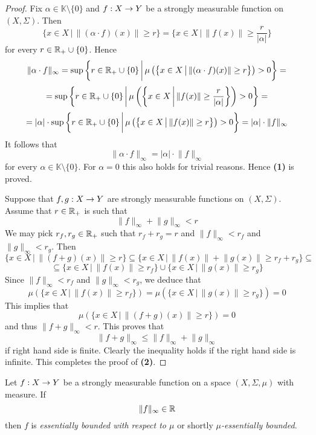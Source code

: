 \begin{proof}
    Fix $\alpha \in \mathbb{K}\setminus \{0\}$ and $f:X\rightarrow Y$ be a strongly measurable function on $(X,\Sigma)$. Then
    $$\{x\in X\,\big|\,\lVert (\alpha \cdot f)(x)\rVert \geq r\big\} = \bigg\{x\in X\,\bigg|\,\lVert f(x)\rVert \geq \frac{r}{|\alpha|}\bigg\}$$
    for every $r \in {\mathbb R}_+\cup \{0\}$. Hence
    $$\lVert \alpha \cdot f\rVert_{\infty} = \sup \bigg\{r\in {\mathbb R}_+\cup \{0\}\,\bigg|\,\mu\left(\big\{x\in X\,\big|\,\lVert (\alpha \cdot f)(x)\rVert \geq r\big\}\right) > 0\bigg\} =$$
    $$= \sup \bigg\{r \in {\mathbb R}_+\cup \{0\}\,\bigg|\,\mu\left(\bigg\{x\in X\,\bigg|\,\lVert f(x)\rVert \geq \frac{r}{|\alpha|}\bigg\}\right) > 0\bigg\} = $$
    $$= |\alpha| \cdot \sup \bigg\{r \in {\mathbb R}_+\cup \{0\}\,\bigg|\,\mu\left(\big\{x\in X\,\big|\,\lVert f(x)\rVert \geq r\big\}\right) > 0\bigg\} = |\alpha|\cdot \lVert f\rVert_{\infty}$$
    It follows that
    $$\lVert \alpha \cdot f\rVert_{\infty} = |\alpha|\cdot \lVert f\rVert_{\infty}$$
    for every $\alpha \in \mathbb{K}\setminus \{0\}$. For $\alpha = 0$ this also holds for trivial reasons. Hence \textbf{(1)} is proved.
    
    Suppose that $f,g:X\rightarrow Y$ are strongly measurable functions on $(X,\Sigma)$. Assume that $r\in {\mathbb R}_+$ is such that
    $$\lVert f \rVert_{\infty} + \lVert g \rVert_{\infty} < r$$
    We may pick $r_f,r_g\in {\mathbb R}_+$ such that $r_f+r_g = r$ and $\lVert f \rVert_{\infty} < r_f$ and $\lVert g \rVert_{\infty} < r_g$. Then
    $$\{x\in X\,\big|\,\lVert (f + g)(x)\rVert \geq r\big\} \subseteq \big\{x\in X\,\big|\,\lVert f(x)\rVert + \lVert g(x)\rVert \geq r_f + r_g\big\} \subseteq $$
    $$\subseteq \big\{x\in X\,\big|\,\lVert f(x)\rVert  \geq r_f\big\} \cup \big\{x\in X\,\big|\,\lVert g(x)\rVert  \geq r_g\big\}$$
    Since $\lVert f \rVert_{\infty} < r_f$ and $\lVert g \rVert_{\infty} < r_g$, we deduce that
    $$\mu\left(\big\{x\in X\,\big|\,\lVert f(x)\rVert  \geq r_f\big\}\right) = \mu\left(\big\{x\in X\,\big|\,\lVert g(x)\rVert  \geq r_g\big\}\right) = 0$$
    This implies that
    $$\mu\left(\{x\in X\,\big|\,\lVert (f + g)(x)\rVert \geq r\big\}\right) = 0$$
    and thus $\lVert f + g\rVert_{\infty} < r$. This proves that
    $$\lVert f + g \rVert_{\infty} \leq \lVert f \rVert_{\infty} + \lVert g \rVert_{\infty}$$
    if right hand side is finite. Clearly the inequality holds if the right hand side is infinite. This completes the proof of \textbf{(2)}.
\end{proof}

\begin{definition}
    Let $f:X\rightarrow Y$ be a strongly measurable function on a space $(X,\Sigma,\mu)$ with measure. If
    $$\lVert f \rVert_{\infty} \in {\mathbb R}$$
    then $f$ is \textit{essentially bounded with respect to $\mu$} or shortly \textit{$\mu$-essentially bounded}.
\end{definition}

